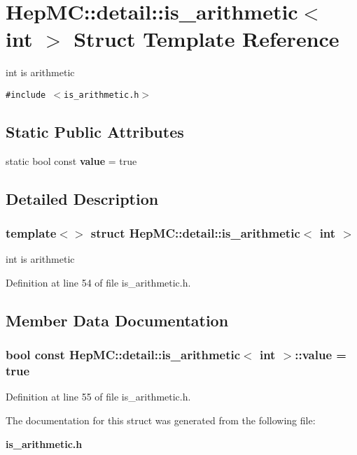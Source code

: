 \section{Hep\-MC::detail::is\_\-arithmetic$<$ int $>$ Struct Template Reference}
\label{structHepMC_1_1detail_1_1is__arithmetic_3_01int_01_4}
int is arithmetic  


{\tt \#include $<$is\_\-arithmetic.h$>$}

\subsection*{Static Public Attributes}
\begin{CompactItemize}
\item 
static bool const {\bf value} = true
\end{CompactItemize}


\subsection{Detailed Description}
\subsubsection*{template$<$$>$ struct Hep\-MC::detail::is\_\-arithmetic$<$ int $>$}

int is arithmetic 



Definition at line 54 of file is\_\-arithmetic.h.

\subsection{Member Data Documentation}
\subsubsection{\setlength{\rightskip}{0pt plus 5cm}bool const {\bf Hep\-MC::detail::is\_\-arithmetic}$<$ int $>$::{\bf value} = true\hspace{0.3cm}{\tt  [static]}}\label{structHepMC_1_1detail_1_1is__arithmetic_3_01int_01_4_c851518d895c0f7d7b834aa2b6deb388}




Definition at line 55 of file is\_\-arithmetic.h.

The documentation for this struct was generated from the following file:\begin{CompactItemize}
\item 
{\bf is\_\-arithmetic.h}\end{CompactItemize}

